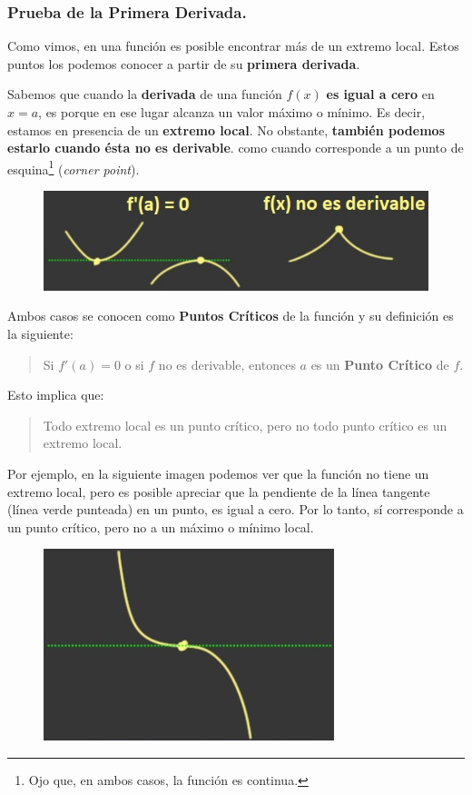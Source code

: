 \documentclass[12pt]{article}
\begin{document}
\subsubsection{Prueba de la Primera Derivada.}

Como vimos, en una función es posible encontrar más de un extremo local. Estos puntos los podemos conocer a partir de su \textbf{primera derivada}.

Sabemos que cuando la \textbf{derivada} de una función $f(x)$ \textbf{es igual a cero} en $x = a$, es porque en ese lugar alcanza un valor máximo o mínimo. Es decir, estamos en presencia de un \textbf{extremo local}. No obstante, \textbf{también podemos estarlo cuando ésta no es derivable}. como cuando corresponde a un punto de esquina\footnote{Ojo que, en ambos casos, la función es continua.} (\textit{corner point}).

\begin{figure}[hbt!]
\centering
\includegraphics[scale=0.7]{img/critical-points.jpg}
\end{figure}

Ambos casos se conocen como \textbf{Puntos Críticos} de la función y su definición es la siguiente:

\begin{quote}
Si $f'(a) = 0$ o si $f$ no es derivable, entonces $a$ es un \textbf{Punto Crítico} de $f$.
\end{quote}

Esto implica que:

\begin{quote}
Todo extremo local es un punto crítico, pero no todo punto crítico es un extremo local.
\end{quote}

\newpage

Por ejemplo, en la siguiente imagen podemos ver que la función no tiene un extremo local, pero es posible apreciar que la pendiente de la línea tangente (línea verde punteada) en un punto, es igual a cero. Por lo tanto, sí corresponde a un punto crítico, pero no a un máximo o mínimo local.

\begin{figure}[hbt!]
\centering
\includegraphics[scale=0.6]{img/critical-points-2.jpg}
\end{figure}
\end{document}
